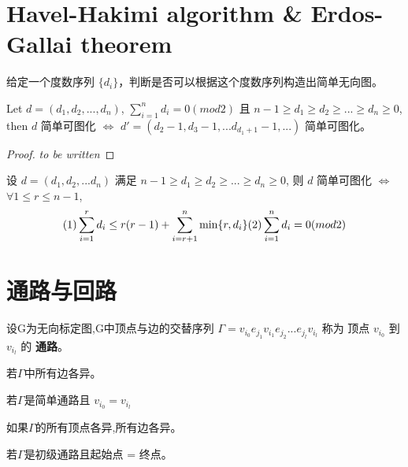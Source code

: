 \documentclass[11pt,fleqn]{book} %
\begin{document}
\begin{CJK}{UTF8}{gkai}
\section{Havel-Hakimi algorithm \& Erdos-Gallai theorem}
给定一个度数序列 $\{d_i\}$，判断是否可以根据这个度数序列构造出简单无向图。
\begin{theorem}
     Let $d = (d_1, d_2, ...,d_n)$, $\sum_{i = 1}^n {d_i} = 0 (mod 2)$ 且 $n-1 \geq d_1 \geq 
    d_2 \geq ... \geq d_n \geq 0$, then $d$ 简单可图化 $\iff$ $d' = (d_2 - 1, d_3 - 1, ... d_{d_1 + 1} - 1, ...)$ 简单可图化。 
\end{theorem}
\begin{proof}
    \textit{to be written}
\end{proof}

\begin{theorem}
     设 $d = (d_1, d_2 ,... d_n)$ 满足 $n-1 \geq d_1 \geq 
    d_2 \geq ... \geq d_n \geq 0$, 则 $d$ 简单可图化 $\iff$ $\forall 1 \leq r \leq n - 1$, 
    \[
        (1)\sum_{i = 1}^r d_i \leq r(r -1) + \sum_{i = r + 1}^{n} \min\{r, d_i\} \newline (2) \sum_{i = 1}^{n} d_i = 0 (mod 2)
        \]
\end{theorem}
\section{通路与回路}

\begin{definition}[通路]
    设G为无向标定图,G中顶点与边的交替序列 $\Gamma = v_{i_0}e_{j_1}v_{i_1}e_{j_2}...e_{j_l}v_{i_l}$ 称为
    顶点 $v_{i_0}$ 到 $v_{i_l}$ 的 \textbf{通路}。
\end{definition}

\begin{definition}
    若$\Gamma$中所有边各异。
\end{definition}
\begin{definition}
    若$\Gamma$是简单通路且 $v_{i_0} = v_{i_l}$
\end{definition}

\begin{definition}
    如果$\Gamma$的所有顶点各异,所有边各异。
\end{definition}

\begin{definition}
  [初级回路，圈] 
  若$\Gamma$是初级通路且起始点 = 终点。   
\end{definition}


\end{CJK}
\end{document}
